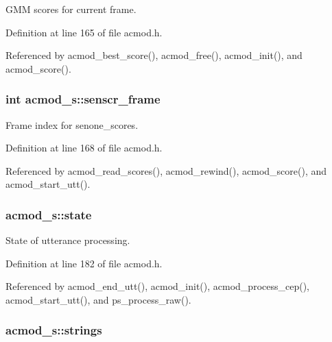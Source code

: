 \-G\-M\-M scores for current frame. 



\-Definition at line 165 of file acmod.\-h.



\-Referenced by acmod\-\_\-best\-\_\-score(), acmod\-\_\-free(), acmod\-\_\-init(), and acmod\-\_\-score().

\subsubsection[{senscr\-\_\-frame}]{\setlength{\rightskip}{0pt plus 5cm}int {\bf acmod\-\_\-s\-::senscr\-\_\-frame}}\label{structacmod__s_ab70ba4caf96b656936d499247e921f00}


\-Frame index for senone\-\_\-scores. 



\-Definition at line 168 of file acmod.\-h.



\-Referenced by acmod\-\_\-read\-\_\-scores(), acmod\-\_\-rewind(), acmod\-\_\-score(), and acmod\-\_\-start\-\_\-utt().

\subsubsection[{state}]{ {\bf acmod\-\_\-s\-::state}}\label{structacmod__s_a06adf606c11e6f4b9869742510a5c23b}


\-State of utterance processing. 



\-Definition at line 182 of file acmod.\-h.



\-Referenced by acmod\-\_\-end\-\_\-utt(), acmod\-\_\-init(), acmod\-\_\-process\-\_\-cep(), acmod\-\_\-start\-\_\-utt(), and ps\-\_\-process\-\_\-raw().

\subsubsection[{strings}]{ {\bf acmod\-\_\-s\-::strings}}\label{structacmod__s_a9f6b699a0fbd43cf7ababab6f0ab81be}


